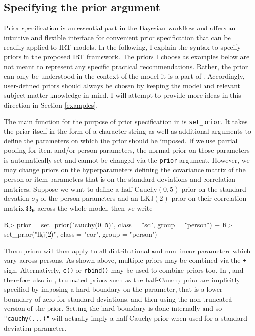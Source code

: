 \documentclass[
]{jss}
\begin{document}
\hypertarget{brms-prior}{%
\subsection{Specifying the prior argument}\label{brms-prior}}

Prior specification is an essential part in the Bayesian workflow and
 offers an intuitive and flexible interface for convenient
prior specification that can be readily applied to IRT models. In the
following, I explain the syntax to specify priors in the proposed IRT
framework. The priors I choose as examples below are not meant to
represent any specific practical recommendations. Rather, the prior can
only be understood in the context of the model it is a part of
\citep{gelman2017}. Accordingly, user-defined priors should always be
chosen by keeping the model and relevant subject matter knowledge in
mind. I will attempt to provide more ideas in this direction in Section
\ref{examples}.

The main function for the purpose of prior specification in 
is \texttt{set\_prior}. It takes the prior itself in the form of a
character string as well as additional arguments to define the
parameters on which the prior should be imposed. If we use partial
pooling for item and/or person parameters, the normal prior on those
parameters is automatically set and cannot be changed via the
\texttt{prior} argument. However, we may change priors on the
hyperparameters defining the covariance matrix of the person or item
parameters that is on the standard deviations and correlation matrices.
Suppose we want to define a \(\text{half-Cauchy}(0, 5)\) prior on the
standard devation \(\sigma_\theta\) of the person parameters and an
\(\text{LKJ}(2)\) prior on their correlation matrix
\(\mathbf{\Omega_\theta}\) across the whole model, then we write

\begin{CodeChunk}

\begin{CodeInput}
R> prior = set_prior("cauchy(0, 5)", class = "sd", group = "person") +
R>   set_prior("lkj(2)", class = "cor", group = "person")
\end{CodeInput}
\end{CodeChunk}

These priors will then apply to all distributional and non-linear
parameters which vary across persons. As shown above, multiple priors
may be combined via the \texttt{+} sign. Alternatively, \texttt{c()} or
\texttt{rbind()} may be used to combine priors too. In ,
and therefore also in , truncated priors such as the
half-Cauchy prior are implicitly specified by imposing a hard boundary
on the parameter, that is a lower boundary of zero for standard
deviations, and then using the non-truncated version of the prior.
Setting the hard boundary is done internally and so
\texttt{"cauchy(...)"} will actually imply a half-Cauchy prior when used
for a standard deviation parameter.
\end{document}
